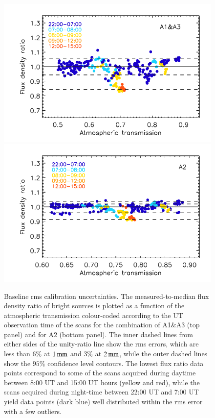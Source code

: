 \documentclass[traditionalabstract]{aa}
\newcommand{\lp}[1]{#1}
\begin{document}
\begin{figure}[!thbp]
  \begin{center}
      \includegraphics[clip=true, trim={0.9cm, 0, 0.5cm, 0.6cm},width=0.75\linewidth]{Figures/plot_flux_density_ratio_obstau_allbright_obsdate_corrected_skydip_rescaled_1mm.pdf}
     \includegraphics[clip=true, trim={0.9cm, 0, 0.5cm, 0.6cm},width=0.75\linewidth]{Figures/plot_flux_density_ratio_obstau_allbright_obsdate_corrected_skydip_rescaled_a2.pdf} 
    \caption[Baseline calibration rms error estimate]{Baseline
      rms calibration uncertainties. The
      measured-to-median flux density ratio of bright sources is
      plotted as a function of the atmospheric transmission
      colour-coded according to the UT
      observation time of the scans for the combination of A1$\&$A3
      (top panel)
      and for A2 (bottom panel).
      The inner dashed lines from either sides of the
      unity-ratio line show the rms errors, {\lp which
      are less than 6\% at $1\,\rm{mm}$ and 3\% at $2\,\rm{mm}$, while
      the outer dashed lines show the $95\%$ confidence level contours.}
      The lowest flux ratio data points correspond to some of the
      scans acquired during daytime between 8:00 UT and 15:00 UT
      hours (yellow and red), while the scans acquired during night-time
      between 22:00 UT and 7:00 UT yield data points (dark blue)
      well distributed within the rms error with a few outliers.}
    \label{fig:allbright_rms_corrected_skydip}
  \end{center}
\end{figure}
\end{document}
